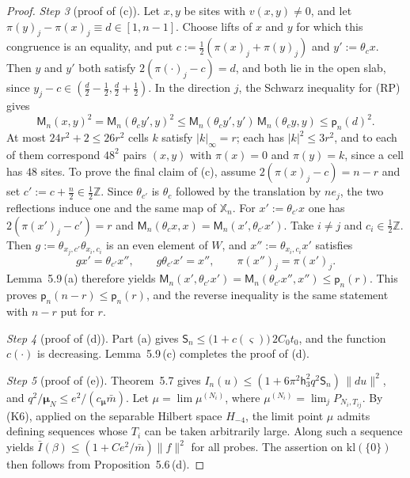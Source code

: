 \documentclass[11pt,letterpaper,reqno]{amsart}
\theoremstyle{definition}
\begin{document}
\begin{proof}
\emph{Step 3} (proof of (c)).
Let $x,y$ be sites with $v(x,y)\ne0$, and let $\pi(y)_j-\pi(x)_j\equiv d\in[1,n-1]$.
Choose lifts of $x$ and $y$ for which this congruence is an equality, and put $c:=\frac12(\pi(x)_j+\pi(y)_j)$ and $y':=\theta_cx$.
Then $y$ and $y'$ both satisfy $2(\pi(\cdot)_j-c)=d$, and both lie in the open slab, since $y_j-c\in(\frac d2-\frac12,\frac d2+\frac12)$.
In the direction $j$, the Schwarz inequality for (RP) gives
\begin{equation*}
\mathsf M_n(x,y)^2=\mathsf M_n(\theta_cy',y)^2\le\mathsf M_n(\theta_cy',y')\,\mathsf M_n(\theta_cy,y)\le\mathsf p_n(d)^2.
\end{equation*}
At most $24r^2+2\le26r^2$ cells $k$ satisfy $|k|_\infty=r$; each has $|k|^2\le3r^2$, and to each of them correspond $48^2$ pairs $(x,y)$ with $\pi(x)=0$ and $\pi(y)=k$, since a cell has $48$ sites.
To prove the final claim of (c), assume $2(\pi(x)_j-c)=n-r$ and set $c':=c+\frac n2\in\frac12\mathbb Z$.
Since $\theta_{c'}$ is $\theta_c$ followed by the translation by $ne_j$, the two reflections induce one and the same map of $\mathbb X_n$.
For $x':=\theta_{c'}x$ one has $2(\pi(x')_j-c')=r$ and $\mathsf M_n(\theta_cx,x)=\mathsf M_n(x',\theta_{c'}x')$.
Take $i\ne j$ and $c_i\in\frac12\mathbb Z$.
Then $g:=\theta_{x_j,c'}\theta_{x_i,c_i}$ is an even element of $W$, and $x'':=\theta_{x_i,c_i}x'$ satisfies
\begin{equation*}
gx'=\theta_{c'}x'',\qquad g\theta_{c'}x'=x'',\qquad\pi(x'')_j=\pi(x')_j.
\end{equation*}
Lemma~5.9\,(a) therefore yields $\mathsf M_n(x',\allowbreak \theta_{c'}x')=\allowbreak \mathsf M_n(\theta_{c'}x'',\allowbreak x'')\le\mathsf p_n(r)$.
This proves $\mathsf p_n(n-r)\le\mathsf p_n(r)$, and the reverse inequality is the same statement with $n-r$ put for $r$.

\emph{Step 4} (proof of (d)).
Part (a) gives $\mathsf S_n\le\bigl(1+c(\varsigma)\bigr)\,2C_0t_0$, and the function $c(\cdot)$ is decreasing.
Lemma~5.9\,(c) completes the proof of (d).

\emph{Step 5} (proof of (e)).
Theorem~5.7 gives $I_n(u)\le(1+6\pi^2\mathsf h_3^2q^2\mathsf S_n)\,\|du\|^2$, and $q^2/\boldsymbol\mu_N\le e^2/(c_{\boldsymbol\mu}\bar m)$.
Let $\mu=\lim\mu^{(N_i)}$, where $\mu^{(N_i)}=\lim_jP_{N_i,T_{ij}}$.
By (K6), applied on the separable Hilbert space $H_{-4}$, the limit point $\mu$ admits defining sequences whose $T_i$ can be taken arbitrarily large.
Along such a sequence \cite[Proposition~47.1\,(b1), (b5)]{QEDIII} yields $\bar I(\beta)\le(1+Ce^2/\bar m)\|f\|^2$ for all probes.
The assertion on $\mathrm{kl}(\{0\})$ then follows from Proposition~5.6\,(d).
\end{proof}
\end{document}
